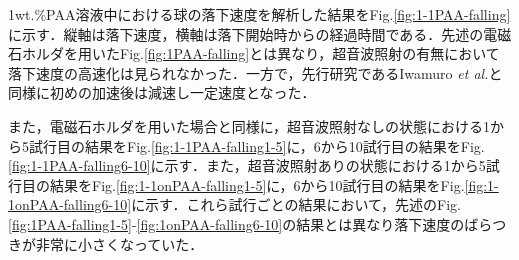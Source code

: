 1wt.\%PAA溶液中における球の落下速度を解析した結果をFig.\ref{fig:1-1PAA-falling}に示す．縦軸は落下速度，横軸は落下開始時からの経過時間である．先述の電磁石ホルダを用いたFig.\ref{fig:1PAA-falling}とは異なり，超音波照射の有無において落下速度の高速化は見られなかった．一方で，先行研究であるIwamuro {\it et al.}\cite{ref:9}と同様に初めの加速後は減速し一定速度となった．

また，電磁石ホルダを用いた場合と同様に，超音波照射なしの状態における1から5試行目の結果をFig.\ref{fig:1-1PAA-falling1-5}に，6から10試行目の結果をFig.\ref{fig:1-1PAA-falling6-10}に示す．また，超音波照射ありの状態における1から5試行目の結果をFig.\ref{fig:1-1onPAA-falling1-5}に，6から10試行目の結果をFig.\ref{fig:1-1onPAA-falling6-10}に示す．これら試行ごとの結果において，先述のFig.\ref{fig:1PAA-falling1-5}-\ref{fig:1onPAA-falling6-10}の結果とは異なり落下速度のばらつきが非常に小さくなっていた．

